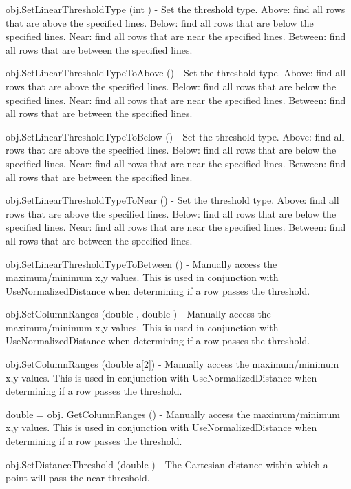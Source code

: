 \begin{DoxyItemize}
\item {\ttfamily obj.\-Set\-Linear\-Threshold\-Type (int )} -\/ Set the threshold type. Above\-: find all rows that are above the specified lines. Below\-: find all rows that are below the specified lines. Near\-: find all rows that are near the specified lines. Between\-: find all rows that are between the specified lines.  
\item {\ttfamily obj.\-Set\-Linear\-Threshold\-Type\-To\-Above ()} -\/ Set the threshold type. Above\-: find all rows that are above the specified lines. Below\-: find all rows that are below the specified lines. Near\-: find all rows that are near the specified lines. Between\-: find all rows that are between the specified lines.  
\item {\ttfamily obj.\-Set\-Linear\-Threshold\-Type\-To\-Below ()} -\/ Set the threshold type. Above\-: find all rows that are above the specified lines. Below\-: find all rows that are below the specified lines. Near\-: find all rows that are near the specified lines. Between\-: find all rows that are between the specified lines.  
\item {\ttfamily obj.\-Set\-Linear\-Threshold\-Type\-To\-Near ()} -\/ Set the threshold type. Above\-: find all rows that are above the specified lines. Below\-: find all rows that are below the specified lines. Near\-: find all rows that are near the specified lines. Between\-: find all rows that are between the specified lines.  
\item {\ttfamily obj.\-Set\-Linear\-Threshold\-Type\-To\-Between ()} -\/ Manually access the maximum/minimum x,y values. This is used in conjunction with Use\-Normalized\-Distance when determining if a row passes the threshold.  
\item {\ttfamily obj.\-Set\-Column\-Ranges (double , double )} -\/ Manually access the maximum/minimum x,y values. This is used in conjunction with Use\-Normalized\-Distance when determining if a row passes the threshold.  
\item {\ttfamily obj.\-Set\-Column\-Ranges (double a\mbox{[}2\mbox{]})} -\/ Manually access the maximum/minimum x,y values. This is used in conjunction with Use\-Normalized\-Distance when determining if a row passes the threshold.  
\item {\ttfamily double = obj. Get\-Column\-Ranges ()} -\/ Manually access the maximum/minimum x,y values. This is used in conjunction with Use\-Normalized\-Distance when determining if a row passes the threshold.  
\item {\ttfamily obj.\-Set\-Distance\-Threshold (double )} -\/ The Cartesian distance within which a point will pass the near threshold.  

\end{DoxyItemize}
